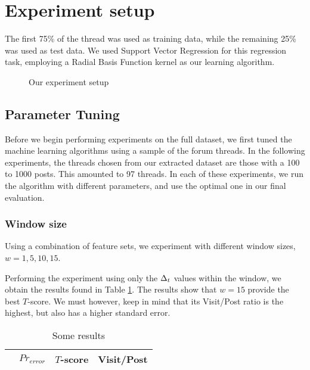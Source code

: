 \section{Experiment setup}
The first 75\% of the thread was used as training data, while the remaining 25\% 
was used as test data. We used Support Vector Regression for this regression 
task, employing a Radial Basis Function kernel as our learning algorithm. 

\begin{figure}
	
	\caption{Our experiment setup}\label{fig:exp_setup}
\end{figure}

\subsection{Parameter Tuning}
Before we begin performing experiments on the full dataset, we first tuned the 
machine learning algorithms using a sample of the forum threads. In the 
following experiments, the threads chosen from our extracted dataset are those 
with a 100 to 1000 posts. This amounted to 97 threads.
In each of these experiments, we run the algorithm with different parameters, 
and use the optimal one in our final evaluation. 

\subsubsection{Window size}
Using a combination of feature sets, we experiment with different window sizes, 
$w = 1, 5, 10, 15$.

Performing the experiment using only the $\Delta_t$ values within the window, we 
obtain the results found in Table \ref{tbl:par_tune_dt}. The results show that 
$w=15$ provide the best $T$-score. We must however, keep in mind that its 
Visit/Post ratio is the highest, but also has a higher standard error.

\begin{table}
\begin{center}
\begin{tabular}{| l | c | c | c |}
\hline
		& $Pr_{error}$		  & $T$-score			   &	Visit/Post\\
\hline
	
\hline
\end{tabular}
\end{center}
\caption{Some results}\label{tbl:par_tune_dt}
\end{table}

